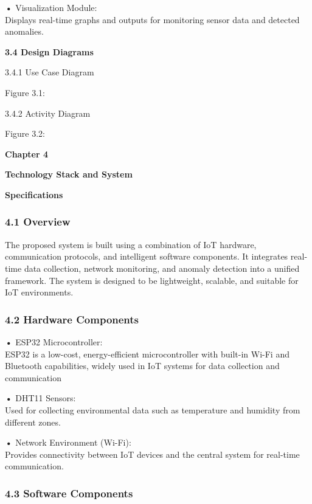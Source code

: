\textbf{•} Visualization Module:\\
Displays real-time graphs and outputs for monitoring sensor data and
detected anomalies.

\textbf{3.4 Design Diagrams}

3.4.1 Use Case Diagram

Figure 3.1:

3.4.2 Activity Diagram

Figure 3.2:

\textbf{Chapter 4}

\textbf{Technology Stack and System}

\textbf{Specifications}

\subsubsection{\texorpdfstring{\textbf{4.1
Overview}}{4.1 Overview}}\label{overview}

The proposed system is built using a combination of IoT hardware,
communication protocols, and intelligent software components. It
integrates real-time data collection, network monitoring, and anomaly
detection into a unified framework. The system is designed to be
lightweight, scalable, and suitable for IoT environments.

\subsubsection{\texorpdfstring{\textbf{4.2 Hardware
Components}}{4.2 Hardware Components}}\label{hardware-components}

\textbf{•} ESP32 Microcontroller:\\
ESP32 is a low-cost, energy-efficient microcontroller with built-in
Wi-Fi and Bluetooth capabilities, widely used in IoT systems for data
collection and communication

\textbf{•} DHT11 Sensors:\\
Used for collecting environmental data such as temperature and humidity
from different zones.

\textbf{•} Network Environment (Wi-Fi):\\
Provides connectivity between IoT devices and the central system for
real-time communication.

\subsubsection{\texorpdfstring{\textbf{4.3 Software
Components}}{4.3 Software Components}}\label{software-components}

